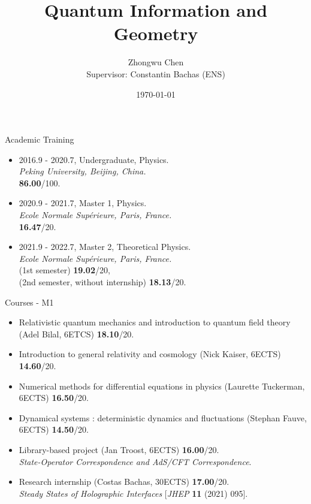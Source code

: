 \documentclass{beamer}
\title[Quantum Information and Geometry]
{Quantum Information and Geometry}
\author[C. Bachas, Z. Chen]{Zhongwu Chen\\
Supervisor: Constantin Bachas (ENS)}
\date{\today}
\begin{document}
\begin{frame}
  \titlepage
\end{frame}

\begin{frame}{Academic Training}
\begin{itemize}
\item 2016.9 - 2020.7, \quad Undergraduate, Physics.\\
\quad \quad \textit{Peking University, Beijing, China.}\\
\hfill \textbf{86.00}/100.

\item 2020.9 - 2021.7, \quad Master 1, Physics.\\
\quad \quad \textit{Ecole Normale Supérieure, Paris, France.}\\
\hfill \textbf{16.47}/20.

\item 2021.9 - 2022.7, \quad Master 2, Theoretical Physics.\\
\quad \quad \textit{Ecole Normale Supérieure, Paris, France.}\\
\hfill (1st semester) \textbf{19.02}/20,\\
\hfill (2nd semester, without internship) \textbf{18.13}/20.

\end{itemize}
\end{frame}

\begin{frame}{Courses - M1}
\begin{itemize}

\item Relativistic quantum mechanics and introduction to quantum field theory (Adel Bilal, 6ETCS)
\hfill \textbf{18.10}/20.

\item Introduction to general relativity and cosmology (Nick Kaiser, 6ECTS)
\hfill \textbf{14.60}/20.

\item Numerical methods for differential equations in physics (Laurette Tuckerman, 6ECTS)
\hfill \textbf{16.50}/20.

\item Dynamical systems : deterministic dynamics and fluctuations (Stephan Fauve, 6ECTS)
\hfill \textbf{14.50}/20.

\vspace{5mm}

\item Library-based project (Jan Troost, 6ECTS)
\hfill \textbf{16.00}/20.
\\
\quad \textit{State-Operator Correspondence and AdS/CFT Correspondence}.

\item Research internship (Costas Bachas, 30ECTS)
\hfill \textbf{17.00}/20.
\\
\quad \textit{Steady States of Holographic Interfaces} [\textit{JHEP} \textbf{11} (2021) 095].


\end{itemize}
\end{frame}
\end{document}
